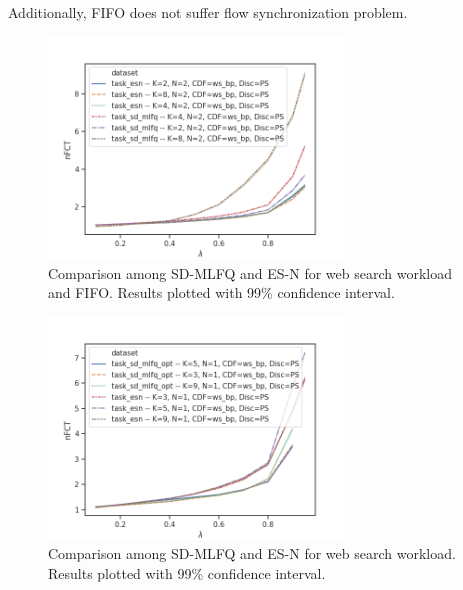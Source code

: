 Additionally, FIFO does not suffer flow synchronization problem.
\begin{figure}
	\centering
	\captionsetup{width=.8\linewidth}
	\includegraphics[width=0.7\textwidth]{Chapter3/Figures/comparison_esn_vs_mlfq_ps_vs_servers}
	\caption{Comparison among SD-MLFQ and ES-N for web search workload and FIFO. Results plotted with 99\% confidence interval.}
\end{figure}%

\begin{figure}
	\centering
	\captionsetup{width=.8\linewidth}
	\includegraphics[width=0.7\textwidth]{Chapter3/Figures/comparison_esn_vs_mlfq_ps_n11}
	\caption{Comparison among SD-MLFQ and ES-N for web search workload. Results plotted with 99\% confidence interval.}
\end{figure}%
